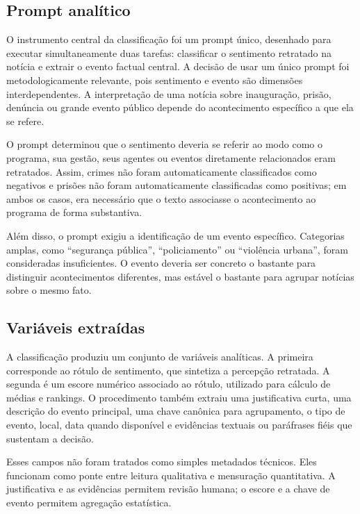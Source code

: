 \documentclass[12pt,a4paper]{article}
\begin{document}
\subsection{Prompt analítico}

O instrumento central da classificação foi um prompt único, desenhado para executar simultaneamente duas tarefas: classificar o sentimento retratado na notícia e extrair o evento factual central. A decisão de usar um único prompt foi metodologicamente relevante, pois sentimento e evento são dimensões interdependentes. A interpretação de uma notícia sobre inauguração, prisão, denúncia ou grande evento público depende do acontecimento específico a que ela se refere.

O prompt determinou que o sentimento deveria se referir ao modo como o programa, sua gestão, seus agentes ou eventos diretamente relacionados eram retratados. Assim, crimes não foram automaticamente classificados como negativos e prisões não foram automaticamente classificadas como positivas; em ambos os casos, era necessário que o texto associasse o acontecimento ao programa de forma substantiva.

Além disso, o prompt exigiu a identificação de um evento específico. Categorias amplas, como ``segurança pública'', ``policiamento'' ou ``violência urbana'', foram consideradas insuficientes. O evento deveria ser concreto o bastante para distinguir acontecimentos diferentes, mas estável o bastante para agrupar notícias sobre o mesmo fato.

\subsection{Variáveis extraídas}

A classificação produziu um conjunto de variáveis analíticas. A primeira corresponde ao rótulo de sentimento, que sintetiza a percepção retratada. A segunda é um escore numérico associado ao rótulo, utilizado para cálculo de médias e rankings. O procedimento também extraiu uma justificativa curta, uma descrição do evento principal, uma chave canônica para agrupamento, o tipo de evento, local, data quando disponível e evidências textuais ou paráfrases fiéis que sustentam a decisão.

Esses campos não foram tratados como simples metadados técnicos. Eles funcionam como ponte entre leitura qualitativa e mensuração quantitativa. A justificativa e as evidências permitem revisão humana; o escore e a chave de evento permitem agregação estatística.
\end{document}
